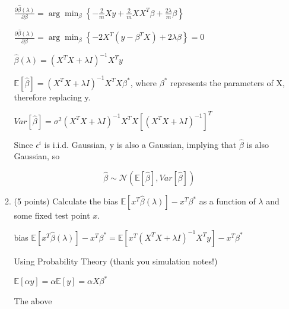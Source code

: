 \documentclass[twoside,10pt]{article}
\begin{document}
\begin{enumerate}
\begin{enumerate}
\vspace{5 mm}

$\frac{\partial{\hat \beta(\lambda)}}{\partial{\beta}} =
\arg\min_{\beta}\left\{-\frac{2}{m}Xy + \frac{2}{m}XX^T\beta + \frac{2\lambda}{m}\beta\right\}$

\vspace{2 mm}
$\frac{\partial{\hat \beta(\lambda)}}{\partial{\beta}} = \arg\min_{\beta}\left\{-2X^T(y - \beta^TX) + 2\lambda\beta\right\} = 0$

\vspace{2 mm}

$\hat\beta(\lambda) = (X^TX + \lambda I)^{-1} X^T y$

\vspace{2 mm}

$\mathbb E[\hat\beta] = (X^TX + \lambda I)^{-1} X^T X \beta^*$, where $\beta^*$ represents the parameters of X, therefore replacing y.

\vspace{2 mm}

$Var[\hat\beta]  = \sigma^2 (X^TX + \lambda I)^{-1} X^T X [(X^TX + \lambda I)^{-1}]^T$

\vspace{2 mm}

Since $\epsilon^i$ is i.i.d. Gaussian, y is also a Gaussian, implying that $\hat \beta$ is also Gaussian, so

$$\hat\beta \sim \mathcal{N}(\mathbb E[\hat\beta],Var[\hat\beta])$$



\item (5 points) Calculate the bias  $\mathbb E[x^T {\hat \beta}(\lambda)] - x^T {\beta^*}$ as a function of $\lambda$ and some fixed test point $x$.

\vspace{5 mm}

bias  $\mathbb E[x^T {\hat \beta}(\lambda)] - x^T {\beta^*} = \mathbb E[x^T {(X^TX + \lambda I)^{-1} X^T y}] - x^T {\beta^*}$

\vspace{2 mm}

Using Probability Theory (thank you simulation notes!)

\vspace{2 mm}

$\mathbb E[\alpha y] = \alpha\mathbb E[y] = \alpha X \beta^*$

\vspace{2 mm}

The above 


\end{enumerate}
\end{enumerate}
\end{document}
